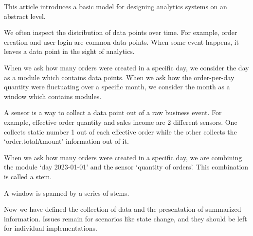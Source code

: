 

This article introduces a basic model for designing analytics systems on an abstract level.



We often inspect the distribution of data points over time.
For example, order creation and user login are common data points.
When some event happens, it leaves a data point in the sight of analytics.

When we ask how many orders were created in a specific day,
we consider the day as a module which contains data points.
When we ask how the order-per-day quantity were fluctuating over a specific month,
we consider the month as a window which contains modules.



A sensor is a way to collect a data point out of a raw business event.
For example, effective order quantity and sales income are 2 different sensors.
One collects static number 1 out of each effective order while the other collects the `order.totalAmount' information out of it.



When we ask how many orders were created in a specific day,
we are combining the module `day 2023-01-01' and the sensor `quantity of orders'.
This combination is called a stem.

A window is spanned by a series of stems.



Now we have defined the collection of data and the presentation of summarized information.
Issues remain for scenarios like state change, and they should be left for individual implementations.

